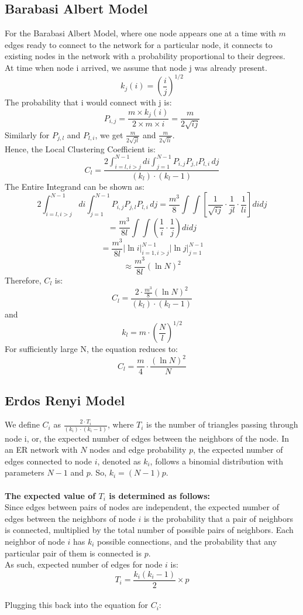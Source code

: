 \documentclass[11pt]{article}
\begin{document}
\subsection{Barabasi Albert Model}
For the Barabasi Albert Model, where one node appears one at a time with $m$ edges ready to connect to the network for a particular node, it connects to existing nodes in the network with a probability proportional to their degrees.\\
At time when node i arrived, we assume that node j was already present. 
$$k_j (i) = \left( \frac{i}{j} \right) ^ {1/2} $$
The probability that i would connect with j is:
$$P_{i,j} = \frac{m \times k_j (i)}{2 \times m \times i} = \frac{m}{2 \sqrt{i j}}$$
Similarly for $P_{j,l}$ and $P_{l,i}$, we get $\frac{m}{2 \sqrt{j l}}$ and $\frac{m}{2 \sqrt{l i}}$. \\
Hence, the Local Clustering Coefficient is:
$$C_l = \frac{2 \int_{i=l,i>j}^{N-1} di \int_{j=1}^{N-1} P_{i,j} P_{j,l} P_{l,i} \, dj}{(k_l) \cdot (k_l - 1)}$$
The Entire Integrand can be shown as:
$$2 \int_{i=l,i>j}^{N-1} di \int_{j=1}^{N-1} P_{i,j} P_{j,l} P_{l,i} \, dj= \frac{m^3}{8} \int \int \left[ \frac{1}{\sqrt{ij}} \cdot \frac{1}{jl} \cdot \frac{1}{li}\right] di dj$$
$$ = \frac{m^3}{8l} \int \int \left(\frac{1}{i}\cdot\frac{1}{j}\right) di dj$$
$$ = \frac{m^3}{8l} \left| \ln{i} \right| _{i=1, i>j}^{N-1} \left| \ln{j} \right| _{j=1}^{N-1}$$
$$ \approx \frac{m^3}{8l} \left( \ln{N}\right)^2$$ 
Therefore, $C_l$ is:
$$C_l = \frac{2\cdot\frac{m^3}{8}\left( \ln{N}\right)^2}{(k_l) \cdot (k_l - 1)}$$
and $$ k_l = m \cdot \left( \frac{N}{l}\right)^{1/2}$$
For sufficiently large N, the equation reduces to:
$$ C_l = \frac{m}{4} \cdot \frac{\left( \ln{N}\right)^2}{N} $$

\subsection{Erdos Renyi Model}
We define $C_i$ as $ \frac{2 \cdot T_i}{(k_i)\cdot(k_i - 1)}$,  where $T_i$ is the number of triangles passing through node i, or, the expected number of edges between the neighbors of the node. In an ER network with $ N $ nodes and edge probability $ p $, the expected number of edges connected to node $ i $, denoted as $ k_i $, follows a binomial distribution with parameters $ N-1 $  and $ p $. So, $ k_i = (N-1)p $. \\ \\
\textbf{The expected value of $T_i$ is determined as follows:}\\
Since edges between pairs of nodes are independent, the expected number of edges between the neighbors of node $ i $ is the probability that a pair of neighbors is connected, multiplied by the total number of possible pairs of neighbors. Each neighbor of node $ i $ has $ k_i $ possible connections, and the probability that any particular pair of them is connected is $ p $.\\
As such, expected number of edges for node $i$ is:
$$ T_i = \frac{k_i(k_i-1)}{2} \times p $$ \\
Plugging this back into the equation for $ C_i $:
\end{document}
